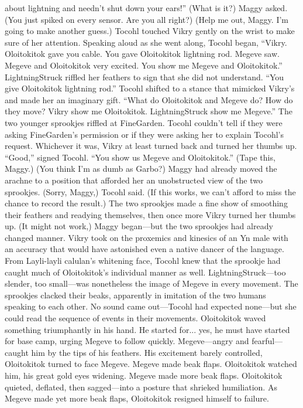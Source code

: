 \documentclass[9pt]{article}
\begin{document}
about lightning and needn’t shut down your ears!”
(What is it?) Maggy asked. (You just spiked on every sensor. Are you all right?)
(Help me out, Maggy. I’m going to make another guess.) Tocohl touched Vikry gently on the wrist to
make sure of her attention. Speaking aloud as she went along, Tocohl began, “Vikry. Oloitokitok gave
you cable. You gave Oloitokitok lightning rod. Megeve saw. Megeve and Oloitokitok very excited. You
show me Megeve and Oloitokitok.”
LightningStruck riffled her feathers to sign that she did not understand.
“You give Oloitokitok lightning rod.” Tocohl shifted to a stance that mimicked Vikry’s and made her
an imaginary gift. “What do Oloitokitok and Megeve do? How do they move? Vikry show me
Oloitokitok. LightningStruck show me Megeve.”
The two younger sprookjes riffled at FineGarden. Tocohl couldn’t tell if they were asking
FineGarden’s permission or if they were asking her to explain Tocohl’s request. Whichever it was, Vikry
at least turned back and turned her thumbs up.
“Good,” signed Tocohl. “You show us Megeve and Oloitokitok.” (Tape this, Maggy.)
(You think I’m as dumb as Garbo?) Maggy had already moved the arachne to a position that
afforded her an unobstructed view of the two sprookjes.
(Sorry, Maggy,) Tocohl said. (If this works, we can’t afford to miss the chance to record the result.)
The two sprookjes made a fine show of smoothing their feathers and readying themselves, then once
more Vikry turned her thumbs up.
(It might not work,) Maggy began—but the two sprookjes had already changed manner. Vikry took
on the proxemics and kinesics of an Yn male with an accuracy that would have astonished even a native
dancer of the language. From Layli-layli calulan’s whitening face, Tocohl knew that the sprookje had
caught much of Oloitokitok’s individual manner as well.
LightningStruck—too slender, too small—was nonetheless the image of Megeve in every movement.
The sprookjes clacked their beaks, apparently in imitation of the two humans speaking to each other.
No sound came out—Tocohl had expected none—but she could read the sequence of events in their
movements.
Oloitokitok waved something triumphantly in his hand. He started for... yes, he must have started for
base camp, urging Megeve to follow quickly.
Megeve—angry and fearful—caught him by the tips of his feathers.
His excitement barely controlled, Oloitokitok turned to face Megeve. Megeve made beak flaps.
Oloitokitok watched him, his great gold eyes widening.
Megeve made more beak flaps. Oloitokitok quieted, deflated, then sagged—into a posture that
shrieked humiliation. As Megeve made yet more beak flaps, Oloitokitok resigned himself to failure.
\end{document}

